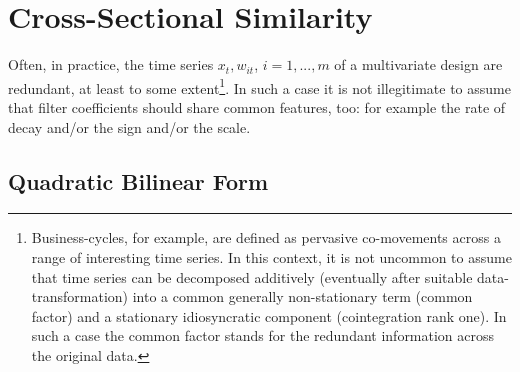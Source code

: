 \documentclass[a4paper]{book}
\begin{document}
\section{Cross-Sectional Similarity}\label{cross_sec_sim}


Often, in practice, the time series $x_t,w_{it}$, $i=1,...,m$ of a multivariate design are redundant, at least to some extent\footnote{Business-cycles, for example, are defined as  pervasive co-movements across a range of interesting time series. In this context, it is not uncommon to assume that time series can be decomposed additively (eventually after suitable data-transformation) into a common generally non-stationary term (common factor) and a stationary idiosyncratic component (cointegration rank one). In such a case the common factor stands for the redundant information across the original data.}. In such a case it is not illegitimate to assume that filter coefficients should share common features, too: for example the rate of decay and/or the sign and/or the scale.

\subsection{Quadratic Bilinear Form}
\end{document}

